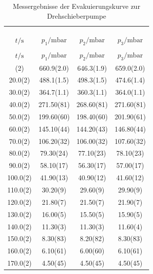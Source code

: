     \begin{longtable}{S[table-format=3.1(1)] S[table-format=3.3(3)] S[table-format=3.3(3)] S[table-format=3.3(3)]}
        \centering\\
        \label{tab:drehEvac}\\
        \caption{Messergebnisse der Evakuierungskurve zur Drehschieberpumpe}\\
        \toprule
        {$t/\si{\second}$} & {$p_1/\si{\milli\bar}$} & {$p_2/\si{\milli\bar}$} & {$p_3/\si{\milli\bar}$} \\
        \midrule
        \endfirsthead
        \caption{Messergebnisse der Evakuierungskurve zur Drehschieberpumpe}\\
        \toprule
        {$t/\si{\second}$} & {$p_1/\si{\milli\bar}$} & {$p_2/\si{\milli\bar}$} & {$p_3/\si{\milli\bar}$} \\
        \midrule
        \endhead
        \bottomrule
        \endfoot
        \bottomrule
        (2) & 660.9(2.0) & 646.3(1.9) & 659.0(2.0)\\ 
        20.0(2) & 488.1(1.5) & 498.3(1.5) & 474.6(1.4)\\ 
        30.0(2) & 364.7(1.1) & 360.3(1.1) & 364.0(1.1)\\ 
        40.0(2) & 271.50(81) & 268.60(81) & 271.60(81)\\ 
        50.0(2) & 199.60(60) & 198.40(60) & 201.90(61)\\ 
        60.0(2) & 145.10(44) & 144.20(43) & 146.80(44)\\ 
        70.0(2) & 106.20(32) & 106.00(32) & 107.60(32)\\ 
        80.0(2) & 79.30(24) & 77.10(23) & 78.10(23)\\ 
        90.0(2) & 58.10(17) & 56.30(17) & 57.00(17)\\ 
        100.0(2) & 41.90(13) & 40.90(12) & 41.60(12)\\ 
        110.0(2) & 30.20(9) & 29.60(9) & 29.90(9)\\ 
        120.0(2) & 21.80(7) & 21.50(7) & 21.90(7)\\ 
        130.0(2) & 16.00(5) & 15.50(5) & 15.90(5)\\ 
        140.0(2) & 11.30(3) & 11.30(3) & 11.60(4)\\ 
        150.0(2) & 8.30(83) & 8.20(82) & 8.30(83)\\ 
        160.0(2) & 6.10(61) & 6.00(60) & 6.10(61)\\ 
        170.0(2) & 4.50(45) & 4.50(45) & 4.50(45)\\ 

\end{longtable}
